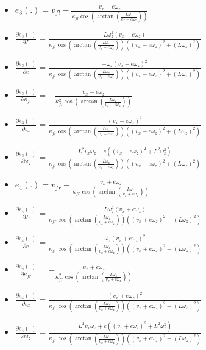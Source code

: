 \documentclass[12pt]{article}
\begin{document}
\begin{itemize}
          \item $e_3(.) = v_{fl} - \frac{v_x - e\omega_z}{\kappa_{fl}
            \cos(\arctan(\frac{L\omega_z}{v_x - e\omega_z}))}$
          \item $\frac{\partial e_3(.)}{\partial L} =
            \frac{L\omega_z^2(v_x - e\omega_z)}{\kappa_{fl}\cos(\arctan(
            \frac{L\omega_z}{v_x - e\omega_z}))((v_x - e\omega_z)^2 +
            (L\omega_z)^2)}$
          \item $\frac{\partial e_3(.)}{\partial e} =
            \frac{-\omega_z(v_x - e\omega_z)^2}{\kappa_{fl}\cos(\arctan(
            \frac{L\omega_z}{v_x - e\omega_z}))((v_x - e\omega_z)^2 +
            (L\omega_z)^2)}$
          \item $\frac{\partial e_3(.)}{\partial \kappa_{fl}} =
            -\frac{v_x - e\omega_z}{\kappa_{fl}^2
            \cos(\arctan(\frac{L\omega_z}{v_x - e\omega_z}))}$
          \item $\frac{\partial e_3(.)}{\partial v_x} =
            \frac{(v_x - e\omega_z)^2}{\kappa_{fl}\cos(\arctan(
            \frac{L\omega_z}{v_x - e\omega_z}))((v_x - e\omega_z)^2 +
            (L\omega_z)^2)}$
          \item $\frac{\partial e_3(.)}{\partial \omega_z} =
            \frac{L^2 v_x \omega_z -e ((v_x - e\omega_z)^2 + L^2\omega_z^2)}
              {\kappa_{fl}\cos(\arctan(
              \frac{L\omega_z}{v_x - e\omega_z}))((v_x - e\omega_z)^2 +
              (L\omega_z)^2)}$

          \item $e_4(.) = v_{fr} - \frac{v_x + e\omega_z}{\kappa_{fr}
            \cos(\arctan(\frac{L\omega_z}{v_x + e\omega_z}))}$
          \item $\frac{\partial e_4(.)}{\partial L} =
            \frac{L\omega_z^2(v_x + e\omega_z)}{\kappa_{fr}\cos(\arctan(
            \frac{L\omega_z}{v_x + e\omega_z}))((v_x + e\omega_z)^2 +
            (L\omega_z)^2)}$
          \item $\frac{\partial e_4(.)}{\partial e} =
            \frac{\omega_z(v_x + e\omega_z)^2}{\kappa_{fr}\cos(\arctan(
            \frac{L\omega_z}{v_x + e\omega_z}))((v_x + e\omega_z)^2 +
            (L\omega_z)^2)}$
          \item $\frac{\partial e_4(.)}{\partial \kappa_{fr}} =
            -\frac{v_x + e\omega_z}{\kappa_{fr}^2
            \cos(\arctan(\frac{L\omega_z}{v_x + e\omega_z}))}$
          \item $\frac{\partial e_4(.)}{\partial v_x} =
            \frac{(v_x + e\omega_z)^2}{\kappa_{fr}\cos(\arctan(
            \frac{L\omega_z}{v_x + e\omega_z}))((v_x + e\omega_z)^2 +
            (L\omega_z)^2)}$
          \item $\frac{\partial e_4(.)}{\partial \omega_z} =
            \frac{L^2 v_x \omega_z + e ((v_x + e\omega_z)^2 + L^2\omega_z^2)}
              {\kappa_{fr}\cos(\arctan(
              \frac{L\omega_z}{v_x + e\omega_z}))((v_x + e\omega_z)^2 +
              (L\omega_z)^2)}$

        \end{itemize}
\end{document}
